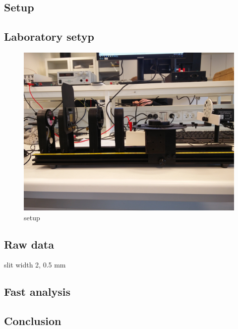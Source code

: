 \documentclass[a4paper, oneside, onecolumn, 11pt]{memoir}
\begin{document}
\subsection{Setup}

\subsection{Laboratory setyp}
\begin{figure}[h]
    \centering
    \includegraphics[width=0.5\textwidht]{setup}
    \caption{setup}
    \label{fig:setup}
\end{figure}

\subsection{Raw data}

slit width 2, 0.5 mm

\subsection{Fast analysis}

\subsection{Conclusion}
\end{document}
